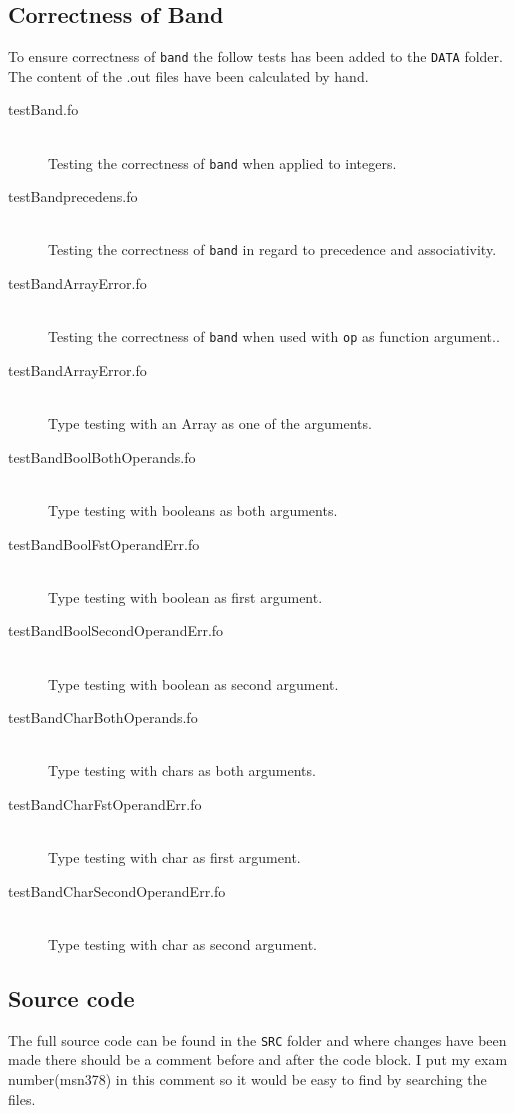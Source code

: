 \documentclass[11pt,a4paper]{article}
\begin{document}
\subsection{Correctness of Band}
To ensure correctness of \texttt{band} the follow tests has been added to the
\texttt{DATA} folder. The content of the .out files have been calculated by
hand.
\begin{description}
  \item[testBand.fo] \hfill \\
  Testing the correctness of \texttt{band} when applied to integers.
  \item[testBandprecedens.fo] \hfill \\
  Testing the correctness of \texttt{band} in regard to precedence and
  associativity.
  \item[testBandArrayError.fo] \hfill \\
  Testing the correctness of \texttt{band} when used with \texttt{op} as
  function argument..
  \item[testBandArrayError.fo] \hfill \\
  Type testing with an Array as one of the arguments.
  \item[testBandBoolBothOperands.fo] \hfill \\
  Type testing with booleans as both arguments.
  \item[testBandBoolFstOperandErr.fo] \hfill \\
  Type testing with boolean as first argument.
  \item[testBandBoolSecondOperandErr.fo] \hfill \\
  Type testing with boolean as second argument.
  \item[testBandCharBothOperands.fo] \hfill \\
  Type testing with chars as both arguments.
  \item[testBandCharFstOperandErr.fo] \hfill \\
  Type testing with char as first argument.
  \item[testBandCharSecondOperandErr.fo] \hfill \\
  Type testing with char as second argument.
\end{description}

\subsection{Source code}
The full source code can be found in the \texttt{SRC} folder and where changes have
been made there should be a comment before and after the code block. I put my
exam number(msn378) in this comment so it would be easy to find by searching the files.
\end{document}
